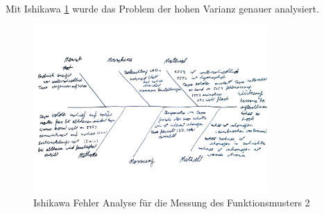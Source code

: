 Mit Ishikawa \ref{fig:IshikwaDavos} wurde das Problem der hohen Varianz genauer analysiert.



\begin{figure}
    \centering
    \includegraphics[width=0.8\textwidth]{Bilder/IshikawaDavos.jpg}
    \caption{Ishikawa Fehler Analyse für die Messung des Funktionsmusters 2}
    \label{fig:IshikwaDavos}
\end{figure}




